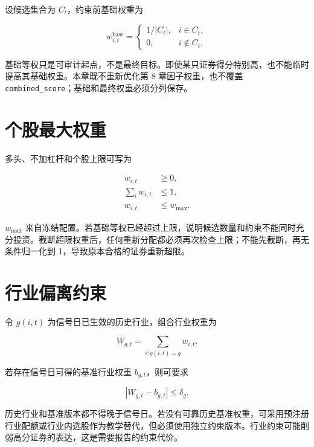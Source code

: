 设候选集合为 \(C_t\)，约束前基础权重为

\begin{equation}
  w^{\mathrm{base}}_{i,t}
  =
  \begin{cases}
    1/|C_t|, & i\in C_t,\\
    0, & i\notin C_t.
  \end{cases}
  \label{eq:ch09-base-weight}
\end{equation}

基础等权只是可审计起点，不是最终目标。即使某只证券得分特别高，也不能临时提高其基础权重。本章既不重新优化第 8 章因子权重，也不覆盖 \texttt{combined\_score}；基础和最终权重必须分列保存。

\section{个股最大权重}

多头、不加杠杆和个股上限可写为

\begin{align}
  w_{i,t} &\ge 0, \\
  \sum_i w_{i,t} &\le 1, \\
  w_{i,t} &\le w_{\max}.
  \label{eq:ch09-long-cap}
\end{align}

\(w_{\max}\) 来自冻结配置。若基础等权已经超过上限，说明候选数量和约束不能同时充分投资。截断超限权重后，任何重新分配都必须再次检查上限；不能先截断，再无条件归一化到 1，导致原本合格的证券重新超限。

\section{行业偏离约束}

令 \(g(i,t)\) 为信号日已生效的历史行业，组合行业权重为

\begin{equation}
  W_{g,t}=\sum_{i:g(i,t)=g}w_{i,t}.
  \label{eq:ch09-industry-weight}
\end{equation}

若存在信号日可得的基准行业权重 \(b_{g,t}\)，则可要求

\begin{equation}
  \left|W_{g,t}-b_{g,t}\right|\le \delta_g.
  \label{eq:ch09-industry-deviation}
\end{equation}

历史行业和基准版本都不得晚于信号日。若没有可靠历史基准权重，可采用预注册行业配额或行业内选股作为教学替代，但必须使用独立约束版本。行业约束可能削弱高分证券的表达，这是需要报告的约束代价。


